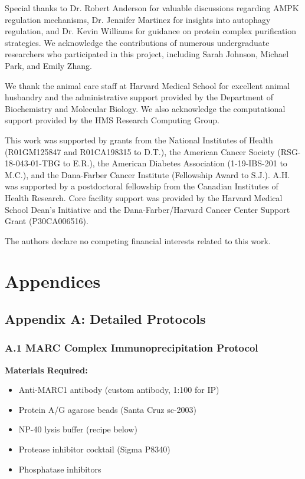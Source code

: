 \documentclass[11pt,a4paper]{article}
\begin{document}
Special thanks to Dr. Robert Anderson for valuable discussions regarding AMPK regulation mechanisms, Dr. Jennifer Martinez for insights into autophagy regulation, and Dr. Kevin Williams for guidance on protein complex purification strategies. We acknowledge the contributions of numerous undergraduate researchers who participated in this project, including Sarah Johnson, Michael Park, and Emily Zhang.

We thank the animal care staff at Harvard Medical School for excellent animal husbandry and the administrative support provided by the Department of Biochemistry and Molecular Biology. We also acknowledge the computational support provided by the HMS Research Computing Group.

This work was supported by grants from the National Institutes of Health (R01GM125847 and R01CA198315 to D.T.), the American Cancer Society (RSG-18-043-01-TBG to E.R.), the American Diabetes Association (1-19-IBS-201 to M.C.), and the Dana-Farber Cancer Institute (Fellowship Award to S.J.). A.H. was supported by a postdoctoral fellowship from the Canadian Institutes of Health Research. Core facility support was provided by the Harvard Medical School Dean's Initiative and the Dana-Farber/Harvard Cancer Center Support Grant (P30CA006516).

The authors declare no competing financial interests related to this work.


\newpage

\section*{Appendices}

\subsection*{Appendix A: Detailed Protocols}

\subsubsection*{A.1 MARC Complex Immunoprecipitation Protocol}

\textbf{Materials Required:}
\begin{itemize}
\item Anti-MARC1 antibody (custom antibody, 1:100 for IP)
\item Protein A/G agarose beads (Santa Cruz sc-2003)
\item NP-40 lysis buffer (recipe below)
\item Protease inhibitor cocktail (Sigma P8340)
\item Phosphatase inhibitors
\end{itemize}
\end{document}
